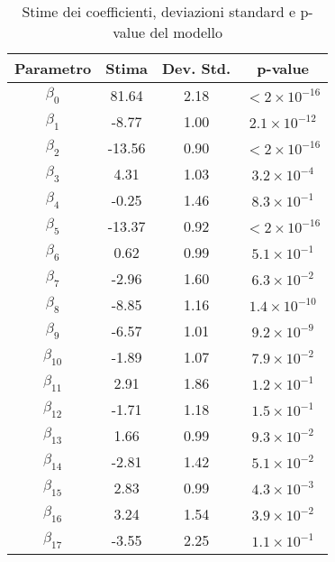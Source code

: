 \begin{table}[H]
	\centering
	\begin{tabular}{|c|c|c|c|}
		\hline
		\textbf{Parametro} & \textbf{Stima} & \textbf{Dev. Std.} & \textbf{p-value} \\
		\hline
		$\beta_0$   & 81.64  & 2.18 & \(< 2 \times 10^{-16}\) \\
		$\beta_1$   & -8.77  & 1.00 & \(2.1 \times 10^{-12}\) \\
		$\beta_2$   & -13.56 & 0.90 & \(< 2 \times 10^{-16}\) \\
		$\beta_3$   & 4.31   & 1.03 & \(3.2 \times 10^{-4}\) \\
		$\beta_4$   & -0.25  & 1.46 & \(8.3 \times 10^{-1}\) \\
		$\beta_5$   & -13.37 & 0.92 & \(< 2 \times 10^{-16}\) \\
		$\beta_6$   & 0.62   & 0.99 & \(5.1 \times 10^{-1}\) \\
		$\beta_7$   & -2.96  & 1.60 & \(6.3 \times 10^{-2}\) \\
		$\beta_8$   & -8.85  & 1.16 & \(1.4 \times 10^{-10}\) \\
		$\beta_9$   & -6.57  & 1.01 & \(9.2 \times 10^{-9}\) \\
		$\beta_{10}$ & -1.89  & 1.07 & \(7.9 \times 10^{-2}\) \\
		$\beta_{11}$ & 2.91   & 1.86 & \(1.2 \times 10^{-1}\) \\
		$\beta_{12}$ & -1.71  & 1.18 & \(1.5 \times 10^{-1}\) \\
		$\beta_{13}$ & 1.66   & 0.99 & \(9.3 \times 10^{-2}\) \\
		$\beta_{14}$ & -2.81  & 1.42 & \(5.1 \times 10^{-2}\) \\
		$\beta_{15}$ & 2.83   & 0.99 & \(4.3 \times 10^{-3}\) \\
		$\beta_{16}$ & 3.24   & 1.54 & \(3.9 \times 10^{-2}\) \\
		$\beta_{17}$ & -3.55  & 2.25 & \(1.1 \times 10^{-1}\) \\
		\hline
	\end{tabular}
	\caption{Stime dei coefficienti, deviazioni standard e p-value del modello}
	\label{tab:coef_stima_std_pval}
\end{table}


